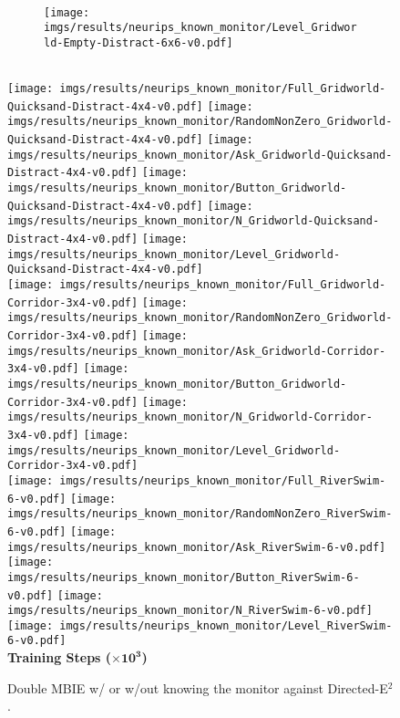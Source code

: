\begin{figure}[tbh]
\begin{subfigure}[b]{0.158\textwidth}
        \\
        \texttt{[image: imgs/results/neurips\_known\_monitor/Level\_Gridworld-Empty-Distract-6x6-v0.pdf]}
    \end{subfigure} 
    \\
    \hfill
    \texttt{[image: imgs/results/neurips\_known\_monitor/Full\_Gridworld-Quicksand-Distract-4x4-v0.pdf]}
    \hfill
     \texttt{[image: imgs/results/neurips\_known\_monitor/RandomNonZero\_Gridworld-Quicksand-Distract-4x4-v0.pdf]}
    \hfill
    \texttt{[image: imgs/results/neurips\_known\_monitor/Ask\_Gridworld-Quicksand-Distract-4x4-v0.pdf]}
    \hfill
     \texttt{[image: imgs/results/neurips\_known\_monitor/Button\_Gridworld-Quicksand-Distract-4x4-v0.pdf]} 
    \hfill
    \texttt{[image: imgs/results/neurips\_known\_monitor/N\_Gridworld-Quicksand-Distract-4x4-v0.pdf]}
    \hfill
    \texttt{[image: imgs/results/neurips\_known\_monitor/Level\_Gridworld-Quicksand-Distract-4x4-v0.pdf]}
    \\
    \hfill
    \texttt{[image: imgs/results/neurips\_known\_monitor/Full\_Gridworld-Corridor-3x4-v0.pdf]}
    \hfill
     \texttt{[image: imgs/results/neurips\_known\_monitor/RandomNonZero\_Gridworld-Corridor-3x4-v0.pdf]}
    \hfill
    \texttt{[image: imgs/results/neurips\_known\_monitor/Ask\_Gridworld-Corridor-3x4-v0.pdf]}
    \hfill
     \texttt{[image: imgs/results/neurips\_known\_monitor/Button\_Gridworld-Corridor-3x4-v0.pdf]} 
    \hfill
    \texttt{[image: imgs/results/neurips\_known\_monitor/N\_Gridworld-Corridor-3x4-v0.pdf]}
    \hfill
    \texttt{[image: imgs/results/neurips\_known\_monitor/Level\_Gridworld-Corridor-3x4-v0.pdf]}
    \\
    \hfill
    \texttt{[image: imgs/results/neurips\_known\_monitor/Full\_RiverSwim-6-v0.pdf]}
    \hfill
     \texttt{[image: imgs/results/neurips\_known\_monitor/RandomNonZero\_RiverSwim-6-v0.pdf]}
    \hfill
    \texttt{[image: imgs/results/neurips\_known\_monitor/Ask\_RiverSwim-6-v0.pdf]}
    \hfill
     \texttt{[image: imgs/results/neurips\_known\_monitor/Button\_RiverSwim-6-v0.pdf]} 
    \hfill
    \texttt{[image: imgs/results/neurips\_known\_monitor/N\_RiverSwim-6-v0.pdf]}
    \hfill
    \texttt{[image: imgs/results/neurips\_known\_monitor/Level\_RiverSwim-6-v0.pdf]}
    \\[-1.5pt]
    {\tiny\textbf{Training Steps ($\mathbf{\times 10^3}$)}}
    \caption{Double MBIE w/ or w/out knowing the monitor against Directed-E$^2$.}
    \label{fig:known_monitor_neurips}
\end{figure}
%
%
%